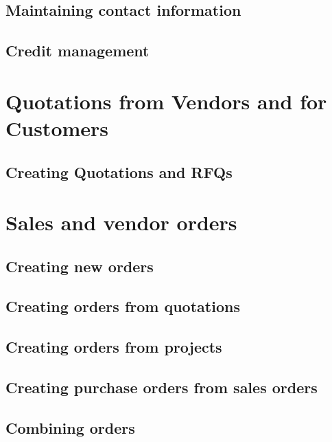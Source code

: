 \documentclass[10pt,A4]{book}
\begin{document}
\section{}

\section{Maintaining contact information}

\section{Credit management}


\chapter{Quotations from Vendors and for Customers}

\section{Creating Quotations and RFQs}

\chapter{Sales and vendor orders}

\section{Creating new orders}

\section{Creating orders from quotations}

\section{Creating orders from projects}

\section{Creating purchase orders from sales orders}

\section{Combining orders}
\end{document}
